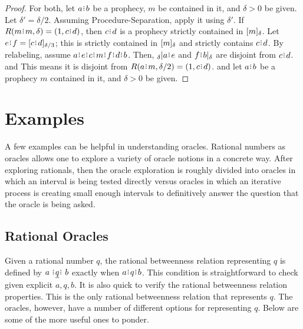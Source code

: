 \documentclass[12pt]{article}
\begin{document}
\begin{proof}
    For both, let $a \rint b$ be a prophecy, $m$ be contained in it, and $\delta >0 $ be given. Let $\delta' = \delta/2$.
    Assuming Procedure-Separation, apply it using $\delta'$.  If $R(m \rint m, \delta) = (1, c \rint d)$, then $c \rint d$ is a prophecy strictly contained in $[m]_{\delta}$. Let $e \rint f = \halo[\delta/3]{c \rint d}$; this is strictly contained in $[m]_{\delta}$ and strictly contains $c \rint d$. By relabeling, assume $a \rint e \rint c \rint m \rint f \rint d \rint b$. Then, ${}_\delta | a \rint e$ and $f \rint b |_\delta$ are disjoint  from $ c\rint d$. and This means it is disjoint from  $R(a \rint m, \delta/2) = (1, c \rint d)$.  and let $a \rint b$ be a prophecy $m$ contained in it, and $ \delta > 0$ be given. 
\end{proof}

\section{Examples}

A few examples can be helpful in understanding oracles. Rational numbers as oracles allows one to explore a variety of oracle notions in a concrete way. After exploring rationals, then the oracle exploration is roughly divided into oracles in which an interval is being tested directly versus oracles in which an iterative process is creating small enough intervals to definitively answer the question that the oracle is being asked. 

\subsection{Rational Oracles}

Given a rational number $q$, the rational betweenness relation representing $q$ is defined by $a \xrel[q] b$ exactly when $a \rint q \rint b$. This condition is straightforward to check given explicit $a, q, b$. It is also quick to verify the rational betweenness relation properties. This is the only rational betweenness relation that represents $q$. The oracles, however, have a number of different options for representing $q$. Below are some of the more useful ones to ponder. 
\end{document}
